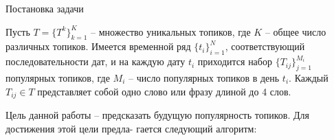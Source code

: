 \documentclass{beamer}
\begin{document}






\begin{frame}{Постановка задачи}

Пусть $T = \{T^k\}_{k=1}^K$ -- множество уникальных топиков, где $K$ -- общее число различных топиков. Имеется временной ряд $\{t_i\}_{i=1}^N$, соответствующий последовательности дат, и на каждую дату $t_i$ приходится набор $\{T_{ij}\}_{j=1}^{M_i}$ популярных топиков, где $M_i$ -- число популярных топиков в день $t_i$. Каждый $T_{ij} \in T$ представляет собой одно слово или фразу длиной до 4 слов.


Цель данной работы – предсказать будущую популярность топиков. Для достижения этой цели предла-
гается следующий алгоритм:
\end{frame}
\end{document}
